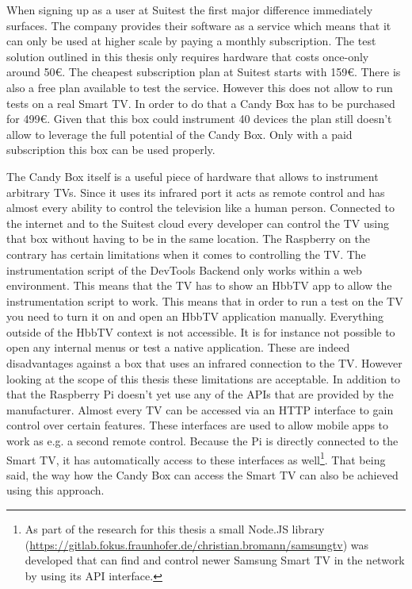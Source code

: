 When signing up as a user at Suitest the first major difference immediately surfaces. The company provides their software
as a service which means that it can only be used at higher scale by paying a monthly subscription. The test solution
outlined in this thesis only requires hardware that costs once-only around 50\euro. The cheapest subscription plan
at Suitest starts with 159\euro. There is also a free plan available to test the service. However this does not allow
to run tests on a real Smart TV. In order to do that a Candy Box has to be purchased for 499\euro. Given that this
box could instrument 40 devices the plan still doesn't allow to leverage the full potential of the Candy Box. Only
with a paid subscription this box can be used properly.

The Candy Box itself is a useful piece of hardware that allows to instrument arbitrary TVs. Since it uses its infrared
port it acts as remote control and has almost every ability to control the television like a human person. Connected
to the internet and to the Suitest cloud every developer can control the TV using that box without having
to be in the same location. The Raspberry on the contrary has certain limitations when it comes to controlling the TV.
The instrumentation script of the DevTools Backend only works within a web environment. This means that the TV has to
show an HbbTV app to allow the instrumentation script to work. This means that in order to run a test on the TV you
need to turn it on and open an HbbTV application manually. Everything outside of the HbbTV context is not accessible.
It is for instance not possible to open any internal menus or test a native application. These are indeed disadvantages
against a box that uses an infrared connection to the TV. However looking at the scope of this thesis these limitations
are acceptable. In addition to that the Raspberry Pi doesn't yet use any of the APIs that are provided by the
manufacturer. Almost every TV can be accessed via an HTTP interface to gain control over certain features. These
interfaces are used to allow mobile apps to work as e.g. a second remote control. Because the Pi is
directly connected to the Smart TV, it has automatically access to these interfaces as well\footnote{As part of the
research for this thesis a small Node.JS library (\url{https://gitlab.fokus.fraunhofer.de/christian.bromann/samsungtv})
was developed that can find and control newer Samsung Smart TV in the network by using its API interface.}. That being
said, the way how the Candy Box can access the Smart TV can also be achieved using this approach.

